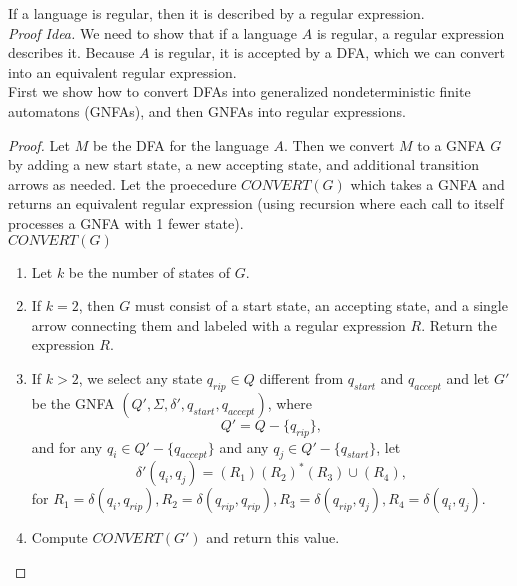 \documentclass[11pt,a4paper]{article}
\begin{document}
\begin{lemma}
    If a language is regular, then it is described by a regular expression. \\

    \textit{Proof Idea.} We need to show that if a language $A$ is regular, a regular expression describes it.
    Because $A$ is regular, it is accepted by a DFA, which we can convert into an equivalent regular expression. \\

    First we show how to convert DFAs into generalized nondeterministic finite automatons (GNFAs), and then GNFAs into regular expressions.

    \begin{proof}
        Let $M$ be the DFA for the language $A$. Then we convert $M$ to a GNFA $G$ by adding a new start state, a new accepting state, and additional transition arrows as needed.
        Let the proecedure $CONVERT(G)$ which takes a GNFA and returns an equivalent regular expression (using recursion where each call to itself processes a GNFA with 1 fewer state). \\

        $CONVERT(G)$
        \begin{enumerate}
            \item Let $k$ be the number of states of $G$.
            \item If $k=2$, then $G$ must consist of a start state, an accepting state, and a single arrow connecting them and labeled with a regular expression $R$. Return the expression $R$.
            \item If $k>2$, we select any state $q_{rip}\in Q$ different from $q_{start}$ and $q_{accept}$ and let $G'$ be the GNFA $(Q',\Sigma,\delta',q_{start},q_{accept})$, where
            $$Q'=Q-\{q_{rip}\},$$
            and for any $q_i\in Q'-\{q_{accept}\}$ and any $q_j\in Q'-\{q_{start}\}$, let
            $$\delta'(q_i,q_j)=(R_1)(R_2)^*(R_3)\cup(R_4),$$
            for $R_1=\delta(q_i,q_{rip}),R_2=\delta(q_{rip},q_{rip}),R_3=\delta(q_{rip},q_j),R_4=\delta(q_i,q_j)$.
            \item Compute $CONVERT(G')$ and return this value.
        \end{enumerate}
    \end{proof}
\end{lemma}
\end{document}
